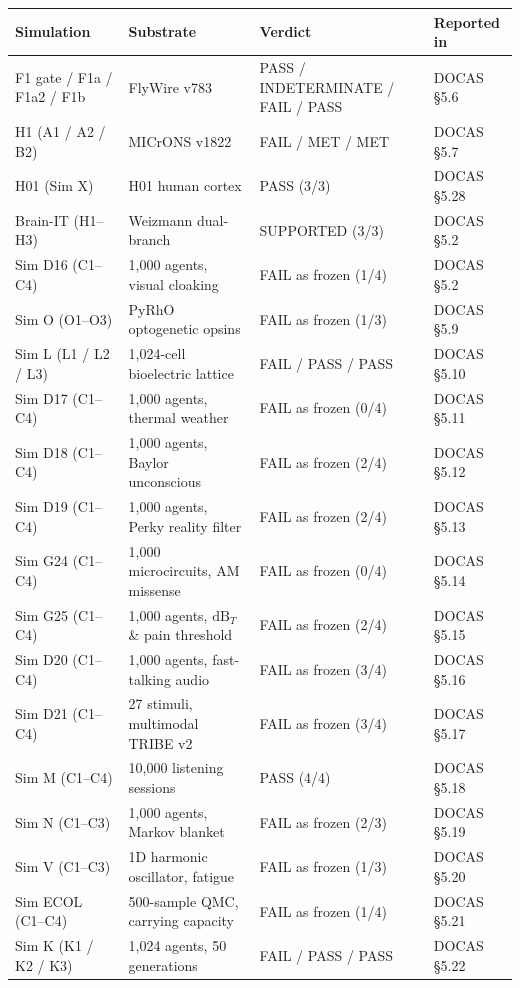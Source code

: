 \documentclass[11pt]{article}
\begin{document}
{\footnotesize{}
\noindent\begin{tabular}{@{}p{3.4cm}lp{4.5cm}l@{}}
\hline
Simulation & Substrate & Verdict & Reported in \\
\hline
F1 gate / F1a / F1a2 / F1b & FlyWire v783 & PASS / INDETERMINATE / FAIL / PASS & DOCAS \S{}5.6 \\
H1 (A1 / A2 / B2) & MICrONS v1822 & FAIL / MET / MET & DOCAS \S{}5.7 \\
H01 (Sim X) & H01 human cortex & PASS (3/3) & DOCAS \S{}5.28 \\
Brain-IT (H1--H3) & Weizmann dual-branch & SUPPORTED (3/3) & DOCAS \S{}5.2 \\
Sim D16 (C1--C4) & 1,000 agents, visual cloaking & FAIL as frozen (1/4) & DOCAS \S{}5.2 \\
Sim O (O1--O3) & PyRhO optogenetic opsins & FAIL as frozen (1/3) & DOCAS \S{}5.9 \\
Sim L (L1 / L2 / L3) & 1,024-cell bioelectric lattice & FAIL / PASS / PASS & DOCAS \S{}5.10 \\
Sim D17 (C1--C4) & 1,000 agents, thermal weather & FAIL as frozen (0/4) & DOCAS \S{}5.11 \\
Sim D18 (C1--C4) & 1,000 agents, Baylor unconscious & FAIL as frozen (2/4) & DOCAS \S{}5.12 \\
Sim D19 (C1--C4) & 1,000 agents, Perky reality filter & FAIL as frozen (2/4) & DOCAS \S{}5.13 \\
Sim G24 (C1--C4) & 1,000 microcircuits, AM missense & FAIL as frozen (0/4) & DOCAS \S{}5.14 \\
Sim G25 (C1--C4) & 1,000 agents, $\text{dB}_T$ \& pain threshold & FAIL as frozen (2/4) & DOCAS \S{}5.15 \\
Sim D20 (C1--C4) & 1,000 agents, fast-talking audio & FAIL as frozen (3/4) & DOCAS \S{}5.16 \\
Sim D21 (C1--C4) & 27 stimuli, multimodal TRIBE v2 & FAIL as frozen (3/4) & DOCAS \S{}5.17 \\
Sim M (C1--C4) & 10,000 listening sessions & PASS (4/4) & DOCAS \S{}5.18 \\
Sim N (C1--C3) & 1,000 agents, Markov blanket & FAIL as frozen (2/3) & DOCAS \S{}5.19 \\
Sim V (C1--C3) & 1D harmonic oscillator, fatigue & FAIL as frozen (1/3) & DOCAS \S{}5.20 \\
Sim ECOL (C1--C4) & 500-sample QMC, carrying capacity & FAIL as frozen (1/4) & DOCAS \S{}5.21 \\
Sim K (K1 / K2 / K3) & 1,024 agents, 50 generations & FAIL / PASS / PASS & DOCAS \S{}5.22 \\

\end{tabular}}
\end{document}

